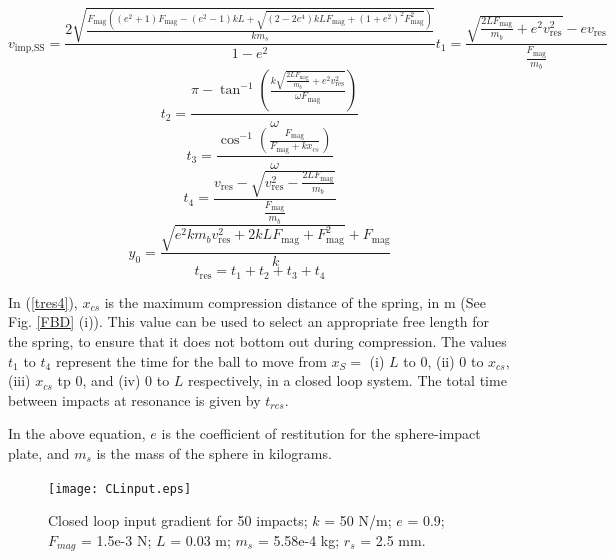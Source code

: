 \documentclass[letterpaper, 10 pt, conference]{ieeeconf}  %
\begin{document}
\begin{equation}
\label{Resonant_CLvelocity}
v_{\text{imp},\text{SS}}=\frac{2 \sqrt{\frac{F_{\text{mag}} \left(\left(e^2+1\right) F_{\text{mag}}-\left(e^2-1\right) k L+\sqrt{\left(2-2 e^4\right) k L F_{\text{mag}}+\left(1+e^2\right)^2 F_{\text{mag}}^2}\right)}{k m_s}}}{1-e^2}
t_1=\frac{\sqrt{\frac{2 L F_{\text{mag}}}{m_b}+e^2 v_{\text{res}}^2}-e v_{\text{res}}}{\frac{F_{\text{mag}}}{m_b}}
\end{equation}
\begin{equation}
t_2=\frac{\pi -\tan ^{-1}\left(\frac{k \sqrt{\frac{2 L F_{\text{mag}}}{m_b}+e^2 v_{\text{res}}^2}}{\omega  F_{\text{mag}}}\right)}{\omega }
\label{tres2}
\end{equation}
\begin{equation}
t_3=\frac{\cos ^{-1}\left(\frac{F_{\text{mag}}}{F_{\text{mag}}+k x_{cs}}\right)}{\omega }
\label{tres3}
\end{equation}
\begin{equation}
t_4=\frac{v_{\text{res}}-\sqrt{v_{\text{res}}^2-\frac{2 L F_{\text{mag}}}{m_b}}}{\frac{F_{\text{mag}}}{m_b}}
\label{tres4}
\end{equation}
\begin{equation}
y_0=\frac{\sqrt{e^2 k m_b v_{\text{res}}^2+2 k L F_{\text{mag}}+F_{\text{mag}}^2}+F_{\text{mag}}}{k}
\label{tres5}
\end{equation}
\begin{equation}
t_{\text{res}}=t_1+t_2+t_3+t_4
\label{tres6}
\end{equation}

In (\ref{tres4}), $x_{cs}$ is the maximum compression distance of the spring, in m (See Fig. \ref{FBD} (i)). This value can be used to select an appropriate free length for the spring, to ensure that it does not bottom out during compression. The values $t_1$ to $t_4$ represent the time for the ball to move from $x_S =$ (i) $L$ to 0, (ii) 0 to $x_{cs}$, (iii) $x_{cs}$ tp 0, and (iv) 0 to $L$ respectively, in a closed loop system. The total time between impacts at resonance is given by $t_{res}$. 






In the above equation, $e$ is the coefficient of restitution for the sphere-impact plate, and $m_s$ is the mass of the sphere in kilograms.


\begin{figure}
	\texttt{[image: CLinput.eps]}
	\caption{Closed loop input gradient for 50 impacts; $k$ = 50 N/m; $e$ = 0.9; $F_{mag}$ = 1.5e-3 N; $L$ = 0.03 m; $m_s$ = 5.58e-4 kg; $r_s$ = 2.5 mm.}
\label{CLinput}
	
\end{figure}
\end{document}
